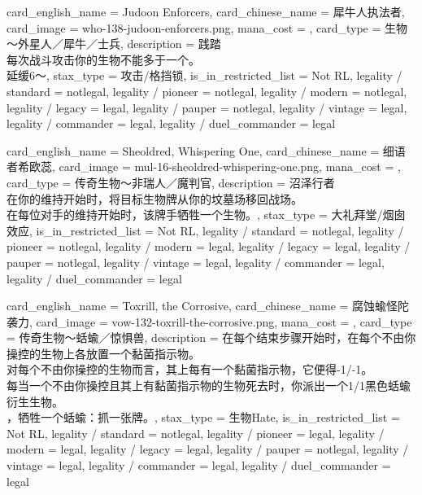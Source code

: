 \documentclass[lang = cn, color = black, 10pt]{AllThatStax}
\begin{document}
\card
{
	card_english_name = {Judoon Enforcers},
	card_chinese_name = {犀牛人执法者},
	card_image = who-138-judoon-enforcers.png,
	mana_cost = ,
	card_type = 生物～外星人／犀牛／士兵,
	description = {践踏\\
每次战斗攻击你的生物不能多于一个。\\
延缓6～},
	stax_type = 攻击/格挡锁,
	is_in_restricted_list = Not RL,
	legality / standard = notlegal,
	legality / pioneer = notlegal,
	legality / modern = notlegal,
	legality / legacy = legal,
	legality / pauper = notlegal,
	legality / vintage = legal,
	legality / commander = legal,
	legality / duel_commander = legal
}

\card
{
	card_english_name = {Sheoldred, Whispering One},
	card_chinese_name = {细语者希欧蕊},
	card_image = mul-16-sheoldred-whispering-one.png,
	mana_cost = ,
	card_type = 传奇生物～非瑞人／魔判官,
	description = {沼泽行者\\
在你的维持开始时，将目标生物牌从你的坟墓场移回战场。\\
在每位对手的维持开始时，该牌手牺牲一个生物。},
	stax_type = 大礼拜堂/烟囱效应,
	is_in_restricted_list = Not RL,
	legality / standard = notlegal,
	legality / pioneer = notlegal,
	legality / modern = legal,
	legality / legacy = legal,
	legality / pauper = notlegal,
	legality / vintage = legal,
	legality / commander = legal,
	legality / duel_commander = legal
}

\card
{
	card_english_name = {Toxrill, the Corrosive},
	card_chinese_name = {腐蚀蝓怪陀袭力},
	card_image = vow-132-toxrill-the-corrosive.png,
	mana_cost = ,
	card_type = 传奇生物～蛞蝓／惊惧兽,
	description = {在每个结束步骤开始时，在每个不由你操控的生物上各放置一个黏菌指示物。\\
对每个不由你操控的生物而言，其上每有一个黏菌指示物，它便得-1/-1。\\
每当一个不由你操控且其上有黏菌指示物的生物死去时，你派出一个1/1黑色蛞蝓衍生生物。\\
，牺牲一个蛞蝓：抓一张牌。},
	stax_type = 生物Hate,
	is_in_restricted_list = Not RL,
	legality / standard = notlegal,
	legality / pioneer = legal,
	legality / modern = legal,
	legality / legacy = legal,
	legality / pauper = notlegal,
	legality / vintage = legal,
	legality / commander = legal,
	legality / duel_commander = legal
}
\end{document}
